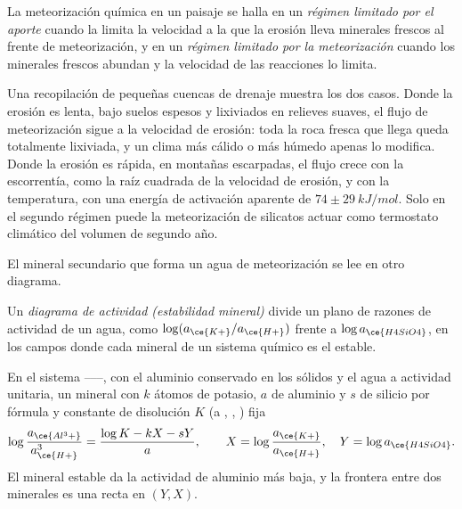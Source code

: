 \begin{definition}\label{def:b3:water-rock-interaction:regimes}
La meteorización química en un paisaje se halla en un \emph{régimen limitado
por el aporte} cuando la limita la velocidad a la que
la erosión lleva minerales frescos al frente de meteorización, y en un
\emph{régimen limitado por la meteorización} cuando los minerales frescos
abundan y la velocidad de las reacciones lo limita.
\end{definition}

Una recopilación de pequeñas cuencas de drenaje muestra los dos casos. Donde la erosión es lenta, bajo
suelos espesos y lixiviados en relieves suaves, el flujo de meteorización sigue a la
velocidad de erosión: toda la roca fresca que llega queda totalmente lixiviada, y un clima más cálido o
más húmedo apenas lo modifica. Donde la erosión es rápida, en montañas escarpadas, el
flujo crece con la escorrentía, como la raíz cuadrada de la velocidad de erosión, y con
la temperatura, con una energía de activación aparente de $74 \pm
\qty{29}{kJ/mol}$. Solo en el segundo régimen puede la meteorización de silicatos actuar como
termostato climático del volumen de segundo año.

El mineral secundario que forma un agua de meteorización se lee en otro
diagrama.

\begin{definition}\label{def:b3:water-rock-interaction:activity-diagram}
Un \emph{diagrama de actividad (estabilidad mineral)}
divide un plano de razones de actividad de un agua, como
$\log(a_{\ce{K+}}/a_{\ce{H+}})$ frente a $\log a_{\ce{H4SiO4}}$, en los
campos donde cada mineral de un sistema químico es el estable.
\end{definition}

\begin{proposition}\label{prop:b3:water-rock-interaction:boundaries}
En el sistema ------, con el aluminio conservado en los sólidos
y el agua a actividad unitaria, un mineral con $k$ átomos de potasio, $a$ de aluminio y
$s$ de silicio por fórmula y constante de disolución $K$ (a ,
, ) fija
\[
\log\frac{a_{\ce{Al^3+}}}{a_{\ce{H+}}^3} = \frac{\log K - kX - sY}{a},
\qquad X = \log\frac{a_{\ce{K+}}}{a_{\ce{H+}}},\quad Y = \log a_{\ce{H4SiO4}}.
\]
El mineral estable da la actividad de aluminio más baja, y la frontera
entre dos minerales es una recta en $(Y, X)$.
\end{proposition}


